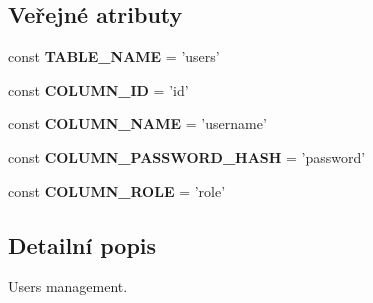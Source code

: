 \subsection*{Veřejné atributy}
\begin{DoxyCompactItemize}
\item 
\hypertarget{classApp_1_1Model_1_1UserManager_ae77830c06b92d32a4948b9e7ef9e5e46}{const {\bfseries T\-A\-B\-L\-E\-\_\-\-N\-A\-M\-E} = 'users'}\label{classApp_1_1Model_1_1UserManager_ae77830c06b92d32a4948b9e7ef9e5e46}

\item 
\hypertarget{classApp_1_1Model_1_1UserManager_a75f9b411c6095d3eb278dc10be81f5e6}{const {\bfseries C\-O\-L\-U\-M\-N\-\_\-\-I\-D} = 'id'}\label{classApp_1_1Model_1_1UserManager_a75f9b411c6095d3eb278dc10be81f5e6}

\item 
\hypertarget{classApp_1_1Model_1_1UserManager_a4019ae437cc39a046444472459631ebd}{const {\bfseries C\-O\-L\-U\-M\-N\-\_\-\-N\-A\-M\-E} = 'username'}\label{classApp_1_1Model_1_1UserManager_a4019ae437cc39a046444472459631ebd}

\item 
\hypertarget{classApp_1_1Model_1_1UserManager_a9c6e473d84c1037c7ec567b6286478fc}{const {\bfseries C\-O\-L\-U\-M\-N\-\_\-\-P\-A\-S\-S\-W\-O\-R\-D\-\_\-\-H\-A\-S\-H} = 'password'}\label{classApp_1_1Model_1_1UserManager_a9c6e473d84c1037c7ec567b6286478fc}

\item 
\hypertarget{classApp_1_1Model_1_1UserManager_af13e6e9c753b0581b42b9305115e5083}{const {\bfseries C\-O\-L\-U\-M\-N\-\_\-\-R\-O\-L\-E} = 'role'}\label{classApp_1_1Model_1_1UserManager_af13e6e9c753b0581b42b9305115e5083}

\end{DoxyCompactItemize}


\subsection{Detailní popis}
Users management. 

